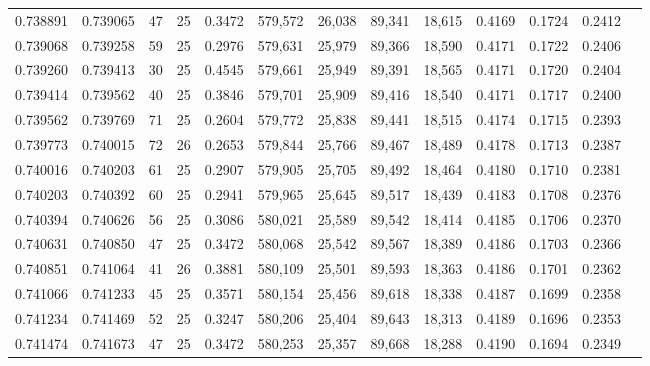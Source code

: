 \begin{tabular}{rrrrrrrrrrrrr}
0.738891 & 0.739065 &    47 &  25 &                                     0.3472 & 579,572 &  26,038 &  89,341 &  18,615 & 0.4169 & 0.1724 & 0.2412 \\
0.739068 & 0.739258 &    59 &  25 &                                     0.2976 & 579,631 &  25,979 &  89,366 &  18,590 & 0.4171 & 0.1722 & 0.2406 \\
0.739260 & 0.739413 &    30 &  25 &                                     0.4545 & 579,661 &  25,949 &  89,391 &  18,565 & 0.4171 & 0.1720 & 0.2404 \\
0.739414 & 0.739562 &    40 &  25 &                                     0.3846 & 579,701 &  25,909 &  89,416 &  18,540 & 0.4171 & 0.1717 & 0.2400 \\
0.739562 & 0.739769 &    71 &  25 &                                     0.2604 & 579,772 &  25,838 &  89,441 &  18,515 & 0.4174 & 0.1715 & 0.2393 \\
0.739773 & 0.740015 &    72 &  26 &                                     0.2653 & 579,844 &  25,766 &  89,467 &  18,489 & 0.4178 & 0.1713 & 0.2387 \\
0.740016 & 0.740203 &    61 &  25 &                                     0.2907 & 579,905 &  25,705 &  89,492 &  18,464 & 0.4180 & 0.1710 & 0.2381 \\
0.740203 & 0.740392 &    60 &  25 &                                     0.2941 & 579,965 &  25,645 &  89,517 &  18,439 & 0.4183 & 0.1708 & 0.2376 \\
0.740394 & 0.740626 &    56 &  25 &                                     0.3086 & 580,021 &  25,589 &  89,542 &  18,414 & 0.4185 & 0.1706 & 0.2370 \\
0.740631 & 0.740850 &    47 &  25 &                                     0.3472 & 580,068 &  25,542 &  89,567 &  18,389 & 0.4186 & 0.1703 & 0.2366 \\
0.740851 & 0.741064 &    41 &  26 &                                     0.3881 & 580,109 &  25,501 &  89,593 &  18,363 & 0.4186 & 0.1701 & 0.2362 \\
0.741066 & 0.741233 &    45 &  25 &                                     0.3571 & 580,154 &  25,456 &  89,618 &  18,338 & 0.4187 & 0.1699 & 0.2358 \\
0.741234 & 0.741469 &    52 &  25 &                                     0.3247 & 580,206 &  25,404 &  89,643 &  18,313 & 0.4189 & 0.1696 & 0.2353 \\
0.741474 & 0.741673 &    47 &  25 &                                     0.3472 & 580,253 &  25,357 &  89,668 &  18,288 & 0.4190 & 0.1694 & 0.2349 \\

\end{tabular}
